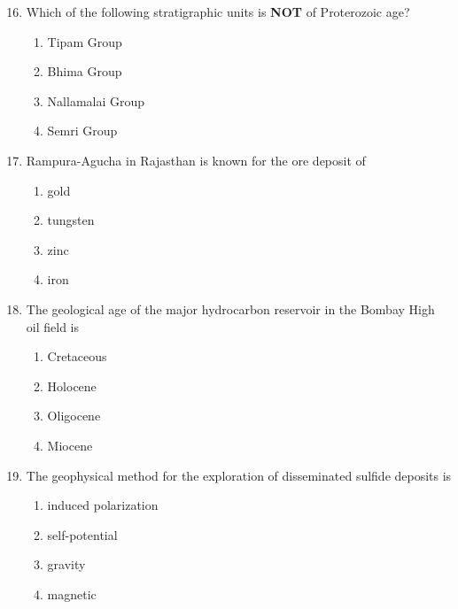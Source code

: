 \documentclass[journal,12pt,onecolumn]{IEEEtran}
\theoremstyle{remark}
\begin{document}
\begin{enumerate}
\setcounter{enumi}{15}

\item Which of the following stratigraphic units is  \textbf{NOT} of Proterozoic age?
\begin{multicols}{2}
\begin{enumerate}
\item Tipam Group  
\item Bhima Group  
\item Nallamalai Group  
\item Semri Group  
\end{enumerate}
\end{multicols}

\item Rampura-Agucha in Rajasthan is known for the ore deposit of
\begin{multicols}{4}
\begin{enumerate}
\item gold  
\item tungsten  
\item zinc  
\item iron  
\end{enumerate}
\end{multicols}

\item The geological age of the major hydrocarbon reservoir in the Bombay High oil field is
\begin{multicols}{4}
\begin{enumerate}
\item Cretaceous  
\item Holocene  
\item Oligocene  
\item Miocene  
\end{enumerate}
\end{multicols}

\item The geophysical method for the exploration of disseminated sulfide deposits is
\begin{multicols}{2}
\begin{enumerate}
\item induced polarization  
\item self-potential  
\item gravity  
\item magnetic  
\end{enumerate}
\end{multicols}


\end{enumerate}
\end{document}
